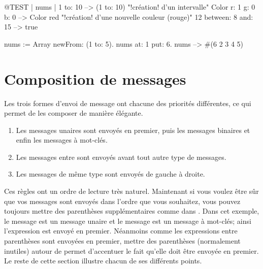 \documentclass[a4paper,10pt,twoside]{book}
\begin{document}

\begin{code}{@TEST | nums |}
1 to: 10                        --> (1 to: 10)  "!cr\'eation! d'un intervalle"
Color r: 1 g: 0 b: 0       --> Color red  "!cr\'eation! d'une nouvelle
couleur (rouge)"
12 between: 8 and: 15 --> true

nums := Array newFrom: (1 to: 5).
nums at: 1 put: 6.
nums --> #(6 2 3 4 5)
\end{code}


\section{Composition de messages}
Les trois formes d'envoi de message ont chacune des priorit\'es diff\'erentes, ce qui permet de les composer de mani\`ere \'el\'egante.

\begin{enumerate}
\item Les messages unaires sont envoy\'es en premier, puis les messages binaires et enfin les messages \`a mot-cl\'es.
\item Les messages entre  sont envoy\'es avant tout autre type de messages. 
\item Les messages de m\^eme type sont envoy\'es de gauche \`a droite. 
\end{enumerate}

Ces r\`egles ont un ordre de lecture tr\`es naturel. Maintenant si
vous voulez \^etre s\^ur que vos messages sont envoy\'es dans l'ordre
que vous souhaitez, vous pouvez toujours mettre des parenth\`eses
suppl\'ementaires comme dans . Dans cet exemple, le
message  est un message unaire et le message 
est un message \`a mot-cl\'es; ainsi l'expression 
est envoy\'e en premier. N\'eanmoins comme les expressions entre
parenth\`eses sont envoy\'ees en premier, mettre des parenth\`eses
(normalement inutiles) autour de  permet d'accentuer
le fait qu'elle
doit \^etre envoy\'ee en premier. Le reste de cette section illustre
chacun de ses diff\'erents points.
\end{document}
